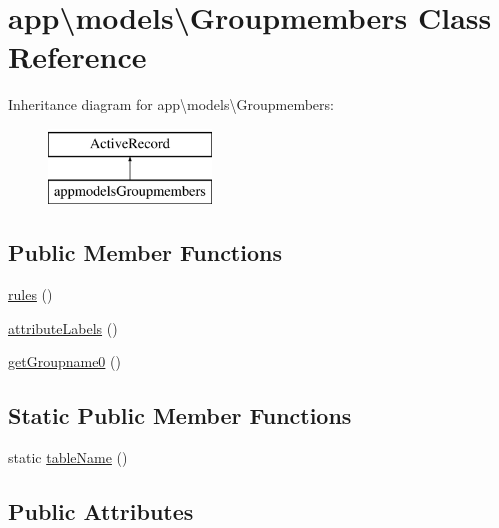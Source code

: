 \hypertarget{classapp_1_1models_1_1Groupmembers}{}\section{app\textbackslash{}models\textbackslash{}Groupmembers Class Reference}
\label{classapp_1_1models_1_1Groupmembers}
Inheritance diagram for app\textbackslash{}models\textbackslash{}Groupmembers\+:\begin{figure}[H]
\begin{center}
\leavevmode
\includegraphics[height=2.000000cm]{classapp_1_1models_1_1Groupmembers}
\end{center}
\end{figure}
\subsection*{Public Member Functions}
\begin{DoxyCompactItemize}
\item 
\hyperlink{classapp_1_1models_1_1Groupmembers_a167dba82b81e6e1d88dc18680ad2cd6a}{rules} ()
\item 
\hyperlink{classapp_1_1models_1_1Groupmembers_ac5e6bcc73e98fd4693f17205d01c56b2}{attribute\+Labels} ()
\item 
\hyperlink{classapp_1_1models_1_1Groupmembers_a29bf461f6cdf4d2b4980108017819e87}{get\+Groupname0} ()
\end{DoxyCompactItemize}
\subsection*{Static Public Member Functions}
\begin{DoxyCompactItemize}
\item 
static \hyperlink{classapp_1_1models_1_1Groupmembers_a869e1a2959ec0776a2d08a47b821cb38}{table\+Name} ()
\end{DoxyCompactItemize}
\subsection*{Public Attributes}
\begin{DoxyCompactItemize}
\end{DoxyCompactItemize}


